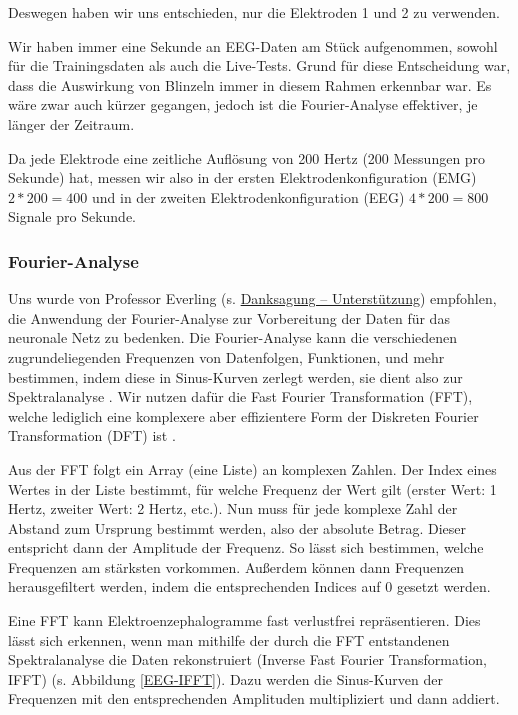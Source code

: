 \documentclass[11pt]{scrartcl}
\begin{document}
	Deswegen haben wir uns entschieden, nur die Elektroden 1 und 2 zu verwenden.

	Wir haben immer eine Sekunde an EEG-Daten am Stück aufgenommen, sowohl für die Trainingsdaten als auch die Live-Tests. Grund für diese Entscheidung war, dass die Auswirkung von Blinzeln immer in diesem Rahmen erkennbar war. Es wäre zwar auch kürzer gegangen, jedoch ist die Fourier-Analyse effektiver, je länger der Zeitraum.

	Da jede Elektrode eine zeitliche Auflösung von 200 Hertz (200 Messungen pro Sekunde) hat, messen wir also in der ersten Elektrodenkonfiguration (EMG) $2 * 200 = 400$ und in der zweiten Elektrodenkonfiguration (EEG) $4 * 200 = 800$ Signale pro Sekunde.

	\subsubsection{Fourier-Analyse}
	
	Uns wurde von Professor Everling (s. \hyperref[Unterstuetzung]{Danksagung -- Unterstützung}) empfohlen, die Anwendung der Fourier-Analyse zur Vorbereitung der Daten für das neuronale Netz zu bedenken. Die Fourier-Analyse kann die verschiedenen zugrundeliegenden Frequenzen von Datenfolgen, Funktionen, und mehr bestimmen, indem diese in Sinus-Kurven zerlegt werden, sie dient also zur Spektralanalyse \cite{3b1b:fft}. Wir nutzen dafür die Fast Fourier Transformation (FFT), welche lediglich eine komplexere aber effizientere Form der Diskreten Fourier Transformation (DFT) ist \cite{FFT-DFT}.

	Aus der FFT folgt ein Array (eine Liste) an komplexen Zahlen. Der Index eines Wertes in der Liste bestimmt, für welche Frequenz der Wert gilt (erster Wert: 1 Hertz, zweiter Wert: 2 Hertz, etc.). Nun muss für jede komplexe Zahl der Abstand zum Ursprung bestimmt werden, also der absolute Betrag. Dieser entspricht dann der Amplitude der Frequenz. So lässt sich bestimmen, welche Frequenzen am stärksten vorkommen. Außerdem können dann Frequenzen herausgefiltert werden, indem die entsprechenden Indices auf 0 gesetzt werden. 

	Eine FFT kann Elektroenzephalogramme fast verlustfrei repräsentieren. Dies lässt sich erkennen, wenn man mithilfe der durch die FFT entstandenen Spektralanalyse die Daten rekonstruiert (Inverse Fast Fourier Transformation, IFFT) (s. Abbildung \ref{EEG-IFFT}). Dazu werden die Sinus-Kurven der Frequenzen mit den entsprechenden Amplituden multipliziert und dann addiert.
\end{document}
